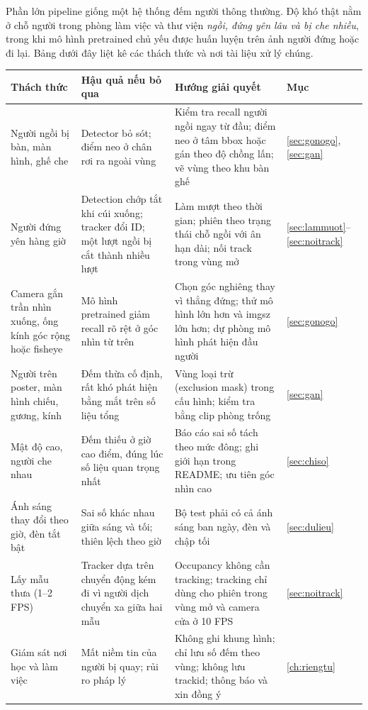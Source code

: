 \documentclass[10pt,a4paper,oneside,openany]{report}
\newcommand{\breakus}{\textunderscore\allowbreak}
\newcommand{\code}[1]{{\ttfamily\let\_\breakus #1}}
\newcommand{\tabhead}[1]{\textsf{\bfseries\color{ink}#1}}
\newenvironment{bang}{\par\small\rowcolors{2}{rowgray}{white}}{\par\vspace{0.3em}}
\begin{document}
Phần lớn pipeline giống một hệ thống đếm người thông thường. Độ khó thật nằm ở chỗ người trong phòng làm việc và thư viện
\emph{ngồi, đứng yên lâu và bị che nhiều}, trong khi mô hình pretrained chủ yếu được huấn luyện trên ảnh người đứng hoặc đi lại.
Bảng dưới đây liệt kê các thách thức và nơi tài liệu xử lý chúng.

\begin{bang}
\begin{xltabular}{\linewidth}{L{32mm}L{42mm}Y L{14mm}}
\toprule
\tabhead{Thách thức} & \tabhead{Hậu quả nếu bỏ qua} & \tabhead{Hướng giải quyết} & \tabhead{Mục} \\
\midrule
\endhead
Người ngồi bị bàn, màn hình, ghế che & Detector bỏ sót; điểm neo ở chân rơi ra ngoài vùng & Kiểm tra recall người ngồi ngay từ đầu; điểm neo ở tâm bbox hoặc gán theo độ chồng lấn; vẽ vùng theo khu bàn ghế & \ref{sec:gonogo}, \ref{sec:gan} \\
Người đứng yên hàng giờ & Detection chớp tắt khi cúi xuống; tracker đổi ID; một lượt ngồi bị cắt thành nhiều lượt & Làm mượt theo thời gian; phiên theo trạng thái chỗ ngồi với ân hạn dài; nối track trong vùng mở & \ref{sec:lammuot}--\ref{sec:noitrack} \\
Camera gắn trần nhìn xuống, ống kính góc rộng hoặc fisheye & Mô hình pretrained giảm recall rõ rệt ở góc nhìn từ trên & Chọn góc nghiêng thay vì thẳng đứng; thử mô hình lớn hơn và \code{imgsz} lớn hơn; dự phòng mô hình phát hiện đầu người & \ref{sec:gonogo} \\
Người trên poster, màn hình chiếu, gương, kính & Đếm thừa cố định, rất khó phát hiện bằng mắt trên số liệu tổng & Vùng loại trừ (exclusion mask) trong cấu hình; kiểm tra bằng clip phòng trống & \ref{sec:gan} \\
Mật độ cao, người che nhau & Đếm thiếu ở giờ cao điểm, đúng lúc số liệu quan trọng nhất & Báo cáo sai số tách theo mức đông; ghi giới hạn trong README; ưu tiên góc nhìn cao & \ref{sec:chiso} \\
Ánh sáng thay đổi theo giờ, đèn tắt bật & Sai số khác nhau giữa sáng và tối; thiên lệch theo giờ & Bộ test phải có cả ánh sáng ban ngày, đèn và chập tối & \ref{sec:dulieu} \\
Lấy mẫu thưa (1--2 FPS) & Tracker dựa trên chuyển động kém đi vì người dịch chuyển xa giữa hai mẫu & Occupancy không cần tracking; tracking chỉ dùng cho phiên trong vùng mở và camera cửa ở 10 FPS & \ref{sec:noitrack} \\
Giám sát nơi học và làm việc & Mất niềm tin của người bị quay; rủi ro pháp lý & Không ghi khung hình; chỉ lưu số đếm theo vùng; không lưu \code{track\_id}; thông báo và xin đồng ý & \ref{ch:riengtu} \\
\bottomrule
\end{xltabular}
\end{bang}
\end{document}
